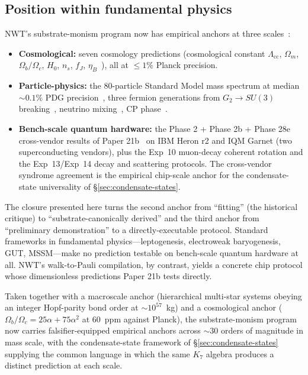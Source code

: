\documentclass[11pt]{article}
\begin{document}
\subsection{Position within fundamental physics}
\label{sec:position}

NWT's substrate-monism program now has empirical anchors at three scales~\cite{Paper21b}:
\begin{itemize}
\item \textbf{Cosmological:} seven cosmology predictions (cosmological constant $\Lambda_\text{cc}$, $\Omega_m$, $\Omega_b / \Omega_c$, $H_0$, $n_s$, $f_J$, $\eta_B$~\cite{Paper25Memo}), all at $\leq 1\%$ Planck precision.
\item \textbf{Particle-physics:} the $80$-particle Standard Model mass spectrum at median $\sim 0.1\%$ PDG precision~\cite{Paper13}, three fermion generations from $G_2 \to SU(3)$ breaking~\cite{Paper20}, neutrino mixing~\cite{Paper20}, CP phase~\cite{Paper13,Paper20}.
\item \textbf{Bench-scale quantum hardware:} the Phase 2 + Phase 2b + Phase 28e cross-vendor results of Paper 21b~\cite{Paper21b} on IBM Heron r2 and IQM Garnet (two superconducting vendors), plus the Exp~10 muon-decay coherent rotation and the Exp~13/Exp~14 decay and scattering protocols.  The cross-vendor syndrome agreement is the empirical chip-scale anchor for the condensate-state universality of \S\ref{sec:condensate-states}.
\end{itemize}

The closure presented here turns the second anchor from ``fitting'' (the historical critique) to ``substrate-canonically derived'' and the third anchor from ``preliminary demonstration'' to a directly-executable protocol.  Standard frameworks in fundamental physics---leptogenesis, electroweak baryogenesis, GUT, MSSM---make no prediction testable on bench-scale quantum hardware at all.  NWT's walk-to-Pauli compilation, by contrast, yields a concrete chip protocol whose dimensionless predictions Paper 21b tests directly.

Taken together with a macroscale anchor (hierarchical multi-star systems obeying an integer Hopf-parity bond order at $\sim 10^{57}$~kg) and a cosmological anchor ($\Omega_b / \Omega_c = 25\alpha + 75\alpha^2$ at $60$~ppm against Planck), the substrate-monism program now carries falsifier-equipped empirical anchors across $\sim 30$ orders of magnitude in mass scale, with the condensate-state framework of \S\ref{sec:condensate-states} supplying the common language in which the same $K_7$ algebra produces a distinct prediction at each scale.
\end{document}
